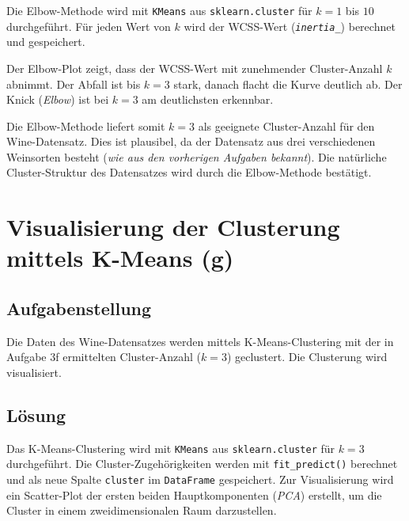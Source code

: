 Die Elbow-Methode wird mit \texttt{KMeans} aus \texttt{sklearn.cluster} für \(k = 1\) bis \(10\) durchgeführt. Für jeden Wert von \(k\) wird der \acs{WCSS}-Wert (\textit{\texttt{inertia\_}}) berechnet und gespeichert.

Der Elbow-Plot zeigt, dass der \acs{WCSS}-Wert mit zunehmender Cluster-Anzahl \(k\) abnimmt. Der Abfall ist bis \(k = 3\) stark, danach flacht die Kurve deutlich ab. Der Knick (\textit{Elbow}) ist bei \(k = 3\) am deutlichsten erkennbar.

Die Elbow-Methode liefert somit \(k = 3\) als geeignete Cluster-Anzahl für den Wine-Datensatz. Dies ist plausibel, da der Datensatz aus drei verschiedenen Weinsorten besteht (\textit{wie aus den vorherigen Aufgaben bekannt}). Die natürliche Cluster-Struktur des Datensatzes wird durch die Elbow-Methode bestätigt.

\cleardoublepage


\section{Visualisierung der Clusterung mittels K-Means (g)}
\label{sec:3g}

\subsection{Aufgabenstellung}

Die Daten des Wine-Datensatzes werden mittels K-Means-Clustering mit der in Aufgabe 3f ermittelten Cluster-Anzahl (\textit{\(k = 3\)}) geclustert. Die Clusterung wird visualisiert.

\subsection{Lösung}

Das K-Means-Clustering wird mit \texttt{KMeans} aus \texttt{sklearn.cluster} für \(k = 3\) durchgeführt. Die Cluster-Zugehörigkeiten werden mit \texttt{fit\_predict()} berechnet und als neue Spalte \texttt{cluster} im \texttt{DataFrame} gespeichert. Zur Visualisierung wird ein Scatter-Plot der ersten beiden Hauptkomponenten (\textit{\acs{PCA}}) erstellt, um die Cluster in einem zweidimensionalen Raum darzustellen.



